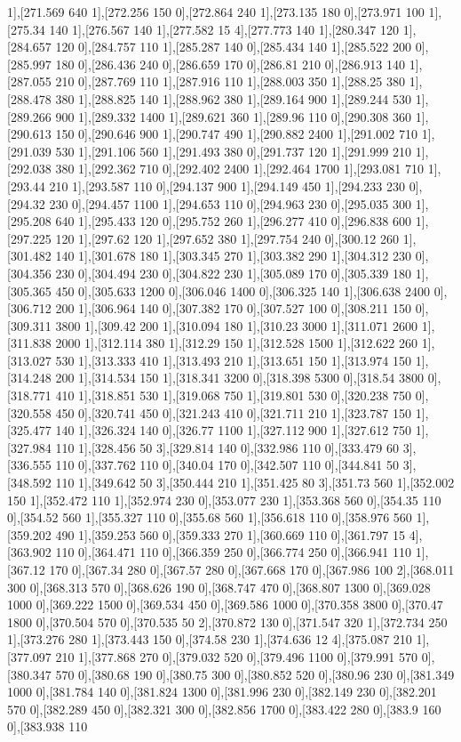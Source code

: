 {1],[271.569 640 1],[272.256 150 0],[272.864 240 1],[273.135 180 0],[273.971 100 1],[275.34 140 1],[276.567 140 1],[277.582 15 4],[277.773 140 1],[280.347 120 1],[284.657 120 0],[284.757 110 1],[285.287 140 0],[285.434 140 1],[285.522 200 0],[285.997 180 0],[286.436 240 0],[286.659 170 0],[286.81 210 0],[286.913 140 1],[287.055 210 0],[287.769 110 1],[287.916 110 1],[288.003 350 1],[288.25 380 1],[288.478 380 1],[288.825 140 1],[288.962 380 1],[289.164 900 1],[289.244 530 1],[289.266 900 1],[289.332 1400 1],[289.621 360 1],[289.96 110 0],[290.308 360 1],[290.613 150 0],[290.646 900 1],[290.747 490 1],[290.882 2400 1],[291.002 710 1],[291.039 530 1],[291.106 560 1],[291.493 380 0],[291.737 120 1],[291.999 210 1],[292.038 380 1],[292.362 710 0],[292.402 2400 1],[292.464 1700 1],[293.081 710 1],[293.44 210 1],[293.587 110 0],[294.137 900 1],[294.149 450 1],[294.233 230 0],[294.32 230 0],[294.457 1100 1],[294.653 110 0],[294.963 230 0],[295.035 300 1],[295.208 640 1],[295.433 120 0],[295.752 260 1],[296.277 410 0],[296.838 600 1],[297.225 120 1],[297.62 120 1],[297.652 380 1],[297.754 240 0],[300.12 260 1],[301.482 140 1],[301.678 180 1],[303.345 270 1],[303.382 290 1],[304.312 230 0],[304.356 230 0],[304.494 230 0],[304.822 230 1],[305.089 170 0],[305.339 180 1],[305.365 450 0],[305.633 1200 0],[306.046 1400 0],[306.325 140 1],[306.638 2400 0],[306.712 200 1],[306.964 140 0],[307.382 170 0],[307.527 100 0],[308.211 150 0],[309.311 3800 1],[309.42 200 1],[310.094 180 1],[310.23 3000 1],[311.071 2600 1],[311.838 2000 1],[312.114 380 1],[312.29 150 1],[312.528 1500 1],[312.622 260 1],[313.027 530 1],[313.333 410 1],[313.493 210 1],[313.651 150 1],[313.974 150 1],[314.248 200 1],[314.534 150 1],[318.341 3200 0],[318.398 5300 0],[318.54 3800 0],[318.771 410 1],[318.851 530 1],[319.068 750 1],[319.801 530 0],[320.238 750 0],[320.558 450 0],[320.741 450 0],[321.243 410 0],[321.711 210 1],[323.787 150 1],[325.477 140 1],[326.324 140 0],[326.77 1100 1],[327.112 900 1],[327.612 750 1],[327.984 110 1],[328.456 50 3],[329.814 140 0],[332.986 110 0],[333.479 60 3],[336.555 110 0],[337.762 110 0],[340.04 170 0],[342.507 110 0],[344.841 50 3],[348.592 110 1],[349.642 50 3],[350.444 210 1],[351.425 80 3],[351.73 560 1],[352.002 150 1],[352.472 110 1],[352.974 230 0],[353.077 230 1],[353.368 560 0],[354.35 110 0],[354.52 560 1],[355.327 110 0],[355.68 560 1],[356.618 110 0],[358.976 560 1],[359.202 490 1],[359.253 560 0],[359.333 270 1],[360.669 110 0],[361.797 15 4],[363.902 110 0],[364.471 110 0],[366.359 250 0],[366.774 250 0],[366.941 110 1],[367.12 170 0],[367.34 280 0],[367.57 280 0],[367.668 170 0],[367.986 100 2],[368.011 300 0],[368.313 570 0],[368.626 190 0],[368.747 470 0],[368.807 1300 0],[369.028 1000 0],[369.222 1500 0],[369.534 450 0],[369.586 1000 0],[370.358 3800 0],[370.47 1800 0],[370.504 570 0],[370.535 50 2],[370.872 130 0],[371.547 320 1],[372.734 250 1],[373.276 280 1],[373.443 150 0],[374.58 230 1],[374.636 12 4],[375.087 210 1],[377.097 210 1],[377.868 270 0],[379.032 520 0],[379.496 1100 0],[379.991 570 0],[380.347 570 0],[380.68 190 0],[380.75 300 0],[380.852 520 0],[380.96 230 0],[381.349 1000 0],[381.784 140 0],[381.824 1300 0],[381.996 230 0],[382.149 230 0],[382.201 570 0],[382.289 450 0],[382.321 300 0],[382.856 1700 0],[383.422 280 0],[383.9 160 0],[383.938 110 }
